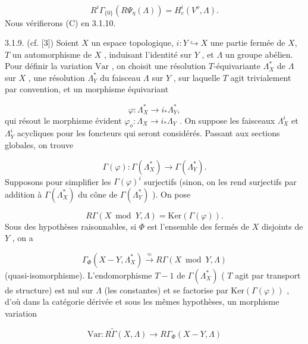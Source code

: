 
\begin{equation}\tag{3.1.8.6}
 R^i\Gamma_{\{0\}}(R\Psi_\eta(\Lambda)) = H^i_c(V^o, \Lambda) .
\end{equation}
Nous vérifierons (C) en 3.1.10.

3.1.9. (cf. [3]) Soient $X$ un espace topologique, $i : Y \hookrightarrow X$ une partie fermée de $X$, $T$ un automorphisme de $X$ , induisant l'identité sur $Y$ , et $\Lambda$ un groupe abélien. Pour définir la variation $\mathrm{Var}$ , on choisit une résolution $T$-équivariante $\Lambda^*_X$ de $\Lambda$ sur $X$ , une résolution $\Lambda^*_Y$ du faisceau $\Lambda$ sur $Y$ , sur laquelle $T$ agit trivialement par convention, et un morphisme équivariant

\begin{equation*}
\varphi : \Lambda^*_X \longrightarrow i_*\Lambda^*_Y ,
\end{equation*}
qui résout le morphisme évident $\varphi_o : \Lambda_X \longrightarrow i_* \Lambda_Y$ . On suppose les faisceaux $\Lambda^i_X$ et $\Lambda^i_Y$ acycliques pour les foncteurs qui seront considérés. Passant aux sections globales, on trouve

\begin{equation*}
\Gamma(\varphi) : \Gamma(\Lambda^*_X) \longrightarrow \Gamma(\Lambda^*_Y) .
\end{equation*}
Supposons pour simplifier les $\Gamma(\varphi)^i$ surjectifs (sinon, on les rend surjectifs par addition à $\Gamma(\Lambda^*_X)$ du cône de $\Gamma(\Lambda^*_Y)$ ). On pose

\begin{equation*}
R\Gamma (X \bmod Y, \Lambda) = \mathrm{Ker}(\Gamma (\varphi)) .
\end{equation*}
Sous des hypothèses raisonnables, si $\Phi$ est l'ensemble des fermés de $X$ disjoints de $Y$ , on a

\begin{equation*}
\Gamma_\Phi(X-Y, \Lambda^*_X) \overset{\approx}{\longrightarrow} R\Gamma (X \bmod Y, \Lambda)
\end{equation*}
(quasi-isomorphisme). L'endomorphisme $T-1$ de $\Gamma(\Lambda^*_X)$ ( $T$ agit par transport de structure) est nul sur $\Lambda$ (les constantes) et se factorise par $\mathrm{Ker}(\Gamma (\varphi))$ , d'où dans la catégorie dérivée et sous les mêmes hypothèses, un morphisme variation

\begin{equation*}
\mathrm{Var} : R\widetilde{\Gamma} (X, \Lambda) \longrightarrow R\Gamma_\Phi (X-Y, \Lambda) 
\end{equation*}

